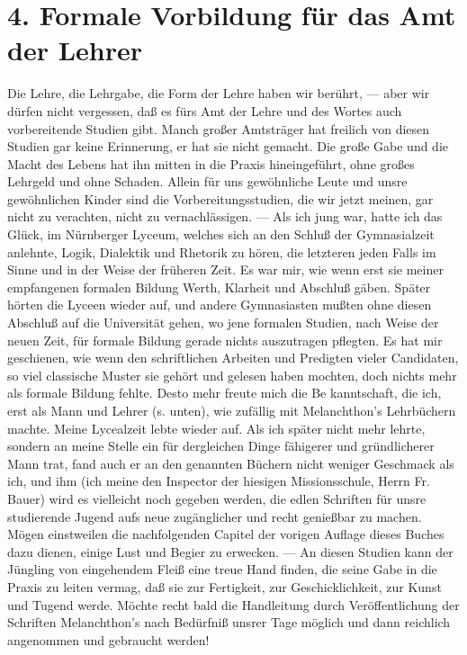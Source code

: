 \section[4. Formale Vorbildung]{4. Formale Vorbildung für das Amt der Lehrer}

Die Lehre, die Lehrgabe, die Form der Lehre haben wir berührt, — aber wir dürfen nicht vergessen, daß es fürs Amt der Lehre und des Wortes auch vorbereitende Studien gibt. Manch großer Amtsträger hat freilich von diesen Studien gar keine Erinnerung, er hat sie nicht gemacht. Die große Gabe und die Macht des Lebens hat ihn mitten in die Praxis hineingeführt, ohne großes Lehrgeld und ohne Schaden. Allein für uns gewöhnliche Leute und unsre gewöhnlichen Kinder sind die Vorbereitungsstudien, die wir jetzt meinen, gar nicht zu verachten, nicht zu vernachlässigen. — Als ich jung war, hatte ich das Glück, im Nürnberger Lyceum, welches sich an den Schluß der Gymnasialzeit anlehnte, Logik, Dialektik und Rhetorik zu hören, die letzteren jeden Falls im Sinne und in der Weise der früheren Zeit. Es war mir, wie wenn erst sie meiner empfangenen formalen Bildung Werth, Klarheit und Abschluß gäben. Später hörten die Lyceen wieder auf, und andere Gymnasiasten mußten ohne diesen Abschluß auf die Universität gehen, wo jene formalen Studien, nach Weise der neuen Zeit, für formale Bildung gerade nichts auszutragen pflegten. Es hat mir geschienen, wie wenn den schriftlichen Arbeiten und Predigten vieler Candidaten, so viel classische Muster sie gehört und gelesen haben mochten, doch nichts mehr als formale Bildung fehlte. Desto mehr freute mich die Be%
kanntschaft, die ich, erst als Mann und Lehrer (s. unten), wie zufällig mit Melanchthon’s Lehrbüchern machte. Meine Lycealzeit lebte wieder auf. Als ich später nicht mehr lehrte, sondern an meine Stelle ein für dergleichen Dinge fähigerer und gründlicherer Mann trat, fand auch er an den genannten Büchern nicht weniger Geschmack als ich, und ihm (ich meine den Inspector der hiesigen Missionsschule, Herrn Fr. Bauer) wird es vielleicht noch gegeben werden, die edlen Schriften für unsre studierende Jugend aufs neue zugänglicher und recht genießbar zu machen. Mögen einstweilen die nachfolgenden Capitel der vorigen Auflage dieses Buches dazu dienen, einige Lust und Begier zu erwecken. — An diesen Studien kann der Jüngling von eingehendem Fleiß eine treue Hand finden, die seine Gabe in die Praxis zu leiten vermag, daß sie zur Fertigkeit, zur Geschicklichkeit, zur Kunst und Tugend werde. Möchte recht bald die Handleitung durch Veröffentlichung der Schriften Melanchthon’s nach Bedürfniß unsrer Tage möglich und dann reichlich angenommen und gebraucht werden!

